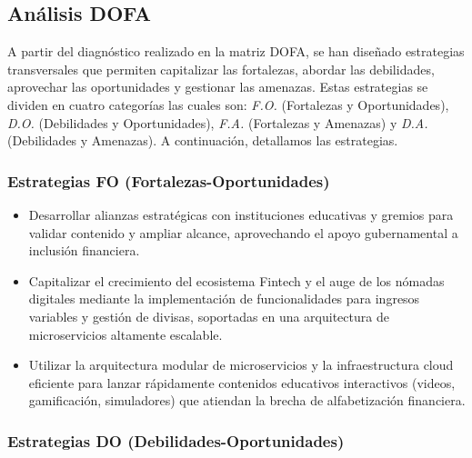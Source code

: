 {}
\subsection*{Análisis DOFA}


A partir del diagnóstico realizado en la matriz DOFA, se han diseñado estrategias transversales que permiten capitalizar las fortalezas, abordar las debilidades, aprovechar las oportunidades y gestionar las amenazas. Estas estrategias se dividen en cuatro categorías las cuales son: \textit{F.O.} (Fortalezas y Oportunidades), \textit{D.O.} (Debilidades y Oportunidades), \textit{F.A.} (Fortalezas y Amenazas) y \textit{D.A.} (Debilidades y Amenazas). A continuación, detallamos las estrategias.

{}
\subsubsection*{Estrategias FO (Fortalezas-Oportunidades)}


\begin{itemize}
	\item Desarrollar alianzas estratégicas con instituciones educativas y gremios para validar contenido y ampliar alcance, aprovechando el apoyo gubernamental a inclusión financiera.
	
	\item Capitalizar el crecimiento del ecosistema Fintech y el auge de los nómadas digitales mediante la implementación de funcionalidades para ingresos variables y gestión de divisas, soportadas en una arquitectura de microservicios altamente escalable.
	
	\item Utilizar la arquitectura modular de microservicios y la infraestructura cloud eficiente para lanzar rápidamente contenidos educativos interactivos (videos, gamificación, simuladores) que atiendan la brecha de alfabetización financiera.
\end{itemize}

{}
\subsubsection*{Estrategias DO (Debilidades-Oportunidades)}


